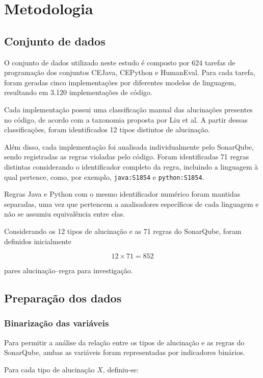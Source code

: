 \section{Metodologia}

\subsection{Conjunto de dados}

O conjunto de dados utilizado neste estudo é composto por 624 tarefas de programação dos conjuntos CEJava, CEPython e HumanEval. Para cada tarefa, foram geradas cinco implementações por diferentes modelos de linguagem, resultando em 3.120 implementações de código.

Cada implementação possui uma classificação manual das alucinações presentes no código, de acordo com a taxonomia proposta por Liu et al. A partir dessas classificações, foram identificados 12 tipos distintos de alucinação.

Além disso, cada implementação foi analisada individualmente pelo SonarQube, sendo registradas as regras violadas pelo código. Foram identificadas 71 regras distintas considerando o identificador completo da regra, incluindo a linguagem à qual pertence, como, por exemplo, \texttt{java:S1854} e \texttt{python:S1854}.

Regras Java e Python com o mesmo identificador numérico foram mantidas separadas, uma vez que pertencem a analisadores específicos de cada linguagem e não se assumiu equivalência entre elas.

Considerando os 12 tipos de alucinação e as 71 regras do SonarQube, foram definidos inicialmente

\[
12 \times 71 = 852
\]

pares alucinação--regra para investigação.

\subsection{Preparação dos dados}

\subsubsection{Binarização das variáveis}

Para permitir a análise da relação entre os tipos de alucinação e as regras do SonarQube, ambas as variáveis foram representadas por indicadores binários.

Para cada tipo de alucinação $X$, definiu-se:

